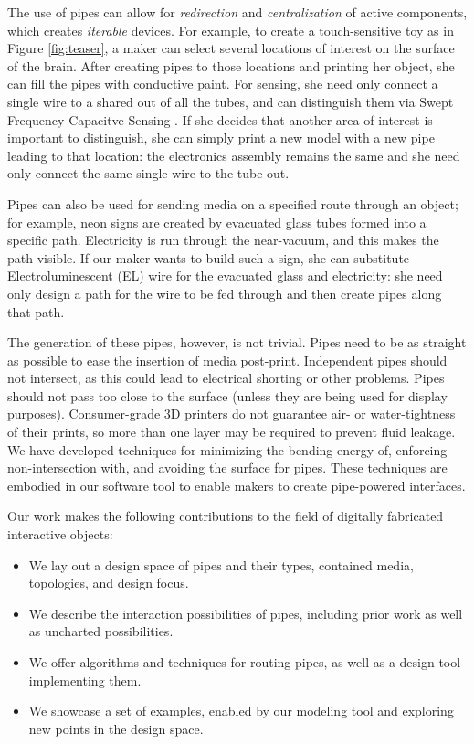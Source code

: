 The use of pipes can allow for \emph{redirection} and \emph{centralization} of active components, which creates \emph{iterable} devices.  For example, to create a touch-sensitive toy as in Figure \ref{fig:teaser}, a maker can select several locations of interest on the surface of the brain.  After creating pipes to those locations and printing her object, she can fill the pipes with conductive paint.  For sensing, she need only connect a single wire to a shared out of all the tubes, and can distinguish them via Swept Frequency Capacitve Sensing \cite{Sato-touche}.  If she decides that another area of interest is important to distinguish, she can simply print a new model with a new pipe leading to that location: the electronics assembly remains the same and she need only connect the same single wire to the tube out.  

Pipes can also be used for sending media on a specified route through an object; for example, neon signs are created by evacuated glass tubes formed into a specific path.  Electricity is run through the near-vacuum, and this makes the path visible.  If our maker wants to build such a sign, she can substitute Electroluminescent (EL) wire for the evacuated glass and electricity: she need only design a path for the wire to be fed through and then create pipes along that path.

The generation of these pipes, however, is not trivial.  Pipes need to be as straight as possible to ease the insertion of media post-print.  Independent pipes should not intersect, as this could lead to electrical shorting or other problems.  Pipes should not pass too close to the surface (unless they are being used for display purposes).  Consumer-grade 3D printers do not guarantee air- or water-tightness of their prints, so more than one layer may be required to prevent fluid leakage.  We have developed techniques for minimizing the bending energy of, enforcing non-intersection with, and avoiding the surface for pipes.  These techniques are embodied in our software tool to enable makers to create pipe-powered interfaces.

Our work makes the following contributions to the field of digitally fabricated interactive objects:

\begin{itemize}
\item We lay out a design space of pipes and their types, contained media, topologies, and design focus.
\item We describe the interaction possibilities of pipes, including prior work as well as uncharted possibilities.
\item We offer algorithms and techniques for routing pipes, as well as a design tool implementing them.
\item We showcase a set of examples, enabled by our modeling tool and exploring new points in the design space.
\end{itemize}

